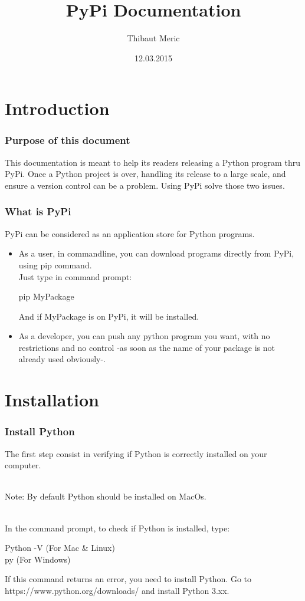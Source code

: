 \documentclass[10pt,letterpaper]{article}
\title{\vspace{\fill}PyPi Documentation}
\author{Thibaut Meric}
\date{12.03.2015\vspace{\fill}}
\begin{document}
\maketitle
\newpage
\renewcommand*\contentsname{\Huge Table of Contents}
\tableofcontents
\newpage
\part {Introduction}
\section {Purpose of this document}
This documentation is meant to help its readers releasing a Python program thru PyPi. Once a Python project is over, handling its release to a large scale, and ensure a version control can be a problem. Using PyPi solve those two issues.
\section {What is PyPi}
PyPi can be considered as an application store for Python programs.
\begin{itemize}
\item As a user, in commandline, you can download programs directly from PyPi,  using pip command.\\
Just type in command prompt:
\begin{mdframed}[backgroundcolor=black, fontcolor=white]
pip MyPackage
\end{mdframed}
And if MyPackage is on PyPi, it will be installed.
\item As a developer, you can push any python program you want, with no restrictions and no control -as soon as the name of your package is not already used obviously-.
\end{itemize}
\part {Installation}
\setcounter{section}{0}
\section {Install Python}
The first step consist in verifying if Python is correctly installed on your computer.\\
\begin{itshape}
\\Note: By default Python should be installed on MacOs.\\
\end{itshape}
\\In the command prompt, to check if Python is installed, type:
\begin{mdframed}[backgroundcolor=black, fontcolor=white]
Python -V \hfill(For Mac \& Linux)\\
py \hfill(For Windows)
\end{mdframed}
If this command returns an error, you need to install Python. Go to https://www.python.org/downloads/ and install Python 3.xx.
\end{document}
